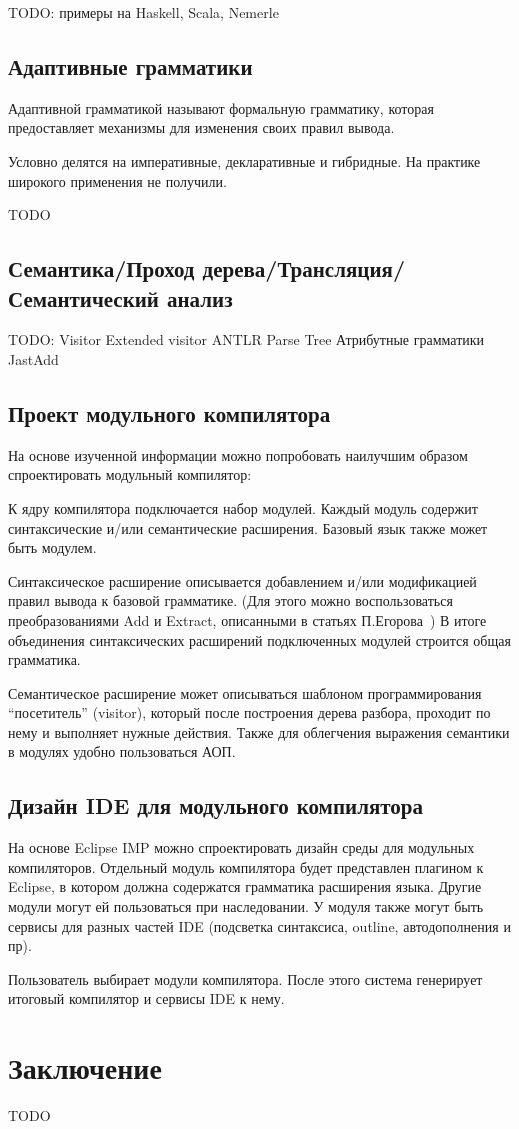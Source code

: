 \documentclass[a4paper,12pt]{article}
\begin{document}
TODO: примеры на Haskell, Scala, Nemerle

\subsection{Адаптивные грамматики}
Адаптивной грамматикой называют формальную грамматику, которая предоставляет
механизмы для изменения своих правил вывода.

Условно делятся на императивные, декларативные и гибридные. На практике
широкого применения не получили.

TODO

\subsection{Семантика/Проход дерева/Трансляция/Семантический анализ}
TODO:
 Visitor
  Extended visitor
 ANTLR Parse Tree
 Атрибутные грамматики
  JastAdd

\subsection{Проект модульного компилятора}
На основе изученной информации можно попробовать наилучшим образом
спроектировать модульный компилятор:

К ядру компилятора подключается набор модулей. Каждый модуль содержит
синтаксические и/или семантические расширения. Базовый язык также может быть
модулем.

Синтаксическое расширение описывается добавлением и/или модификацией правил
вывода к базовой грамматике. (Для этого можно воспользоваться преобразованиями
Add и Extract, описанными в статьях П.Егорова~\cite{Egor}) В итоге объединения
синтаксических расширений подключенных модулей строится общая грамматика.

Семантическое расширение может описываться шаблоном программирования
``посетитель'' (visitor), который после построения дерева разбора, проходит по
нему и выполняет нужные действия. Также для облегчения выражения семантики в
модулях удобно пользоваться АОП.

\subsection{Дизайн IDE для модульного компилятора}

На основе Eclipse IMP можно спроектировать дизайн среды для модульных
компиляторов.
Отдельный модуль компилятора будет представлен плагином к Eclipse, в котором
должна содержатся грамматика расширения языка. Другие модули могут ей
пользоваться при наследовании. У модуля также могут быть сервисы для разных
частей IDE (подсветка синтаксиса, outline, автодополнения и пр).

Пользователь выбирает модули компилятора. После этого система генерирует
итоговый компилятор и сервисы IDE к нему.

\section{Заключение}

TODO

\small
\nocite{*}

{}

\end{document}
